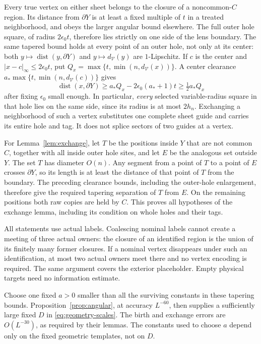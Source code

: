 \documentclass[11pt]{article}
\numberwithin{equation}{section}
\theoremstyle{definition}
\theoremstyle{remark}
\begin{document}
Every true vertex on either sheet belongs to the closure of a
noncommon-$C$ region.  Its distance from $\partial Y$ is at least a
fixed multiple of $t$ in a treated neighborhood, and obeys the larger
angular bound elsewhere.  The full outer hole square, of radius
$2\epsilon_0t$, therefore lies strictly on one side of the lens
boundary.  The same tapered bound holds at every point of an outer hole, not only
at its center: both $y\mapsto\operatorname{dist}(y,\partial Y)$ and
$y\mapsto d_{\mathcal V}(y)$ are $1$-Lipschitz. If $c$ is the center
and $|x-c|_\infty\le2\epsilon_0t$, put
$Q_x=\max\{t,\min(n,d_{\mathcal V}(x))\}$. A center clearance
$a_*\max\{t,\min(n,d_{\mathcal V}(c))\}$ gives
\[
 \operatorname{dist}(x,\partial Y)\ge a_*Q_x-2\epsilon_0(a_*+1)t
                   \ge \tfrac12a_*Q_x
\]
after fixing $\epsilon_0$ small enough. In particular, \emph{every}
selected variable-radius square in that hole lies on the same side,
since its radius is at most $2h_n$.  Exchanging a neighborhood of such a vertex substitutes one
complete sheet guide and carries its entire hole and tag.  It does
not splice sectors of two guides at a vertex.

For Lemma~\ref{lem:exchange}, let $T$ be the positions inside $Y$
that are not common $C$, together with all inside outer hole sites,
and let $E$ be the analogous set outside $Y$.  The set $T$ has
diameter $O(n)$.  Any segment from a point of $T$ to a point of $E$
crosses $\partial Y$, so its length is at least the distance of that
point of $T$ from the boundary.  The preceding clearance bounds,
including the outer-hole enlargement, therefore give the required
tapering separation of $T$ from $E$.  On the remaining positions both
raw copies are held by $C$.  This proves all hypotheses of the exchange
lemma, including its condition on whole holes and their tags.

All statements use actual labels.  Coalescing nominal labels cannot
create a meeting of three actual owners: the closure of an identified
region is the union of its finitely many former closures.  If a nominal
vertex disappears under such an identification, at most two actual
owners meet there and no vertex encoding is required.  The same
argument covers the exterior placeholder.  Empty physical targets
need no information estimate.

Choose one fixed $a>0$ smaller than all the surviving constants in
these tapering bounds.  Proposition~\ref{prop:angular}, at accuracy
$L^{-60}$, then supplies a sufficiently large fixed $D$ in
\eqref{eq:geometry-scales}.  The birth and exchange errors are
$O(L^{-30})$, as required by their lemmas.  The constants used to
choose $a$ depend only on the fixed geometric templates, not on $D$.
\end{document}
